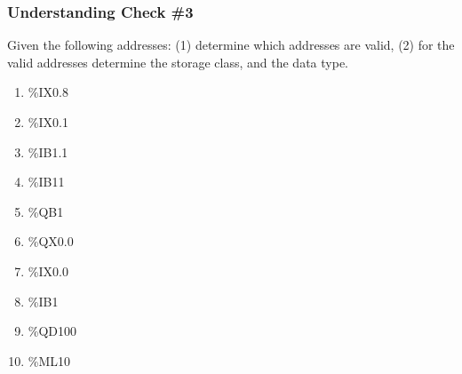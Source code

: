 \subsubsection*{Understanding Check \#3}
Given the following addresses: (1) determine which addresses are valid, (2) for the valid addresses determine the storage class, and the data type.

\begin{enumerate}[noitemsep]
    \item \%IX0.8
    \item \%IX0.1
    \item \%IB1.1
    \item \%IB11
    \item \%QB1
    \item \%QX0.0
    \item \%IX0.0
    \item \%IB1
    \item \%QD100
    \item \%ML10
\end{enumerate}
